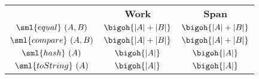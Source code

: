 \begin{costspec}[StringElt]
\label{cost:string}
\begin{tabular}{c|c|c}
& \textbf{Work} & \textbf{Span} \\
$\sml{equal}~(A,B)$ & $\bigoh{|A| + |B|}$ & $\bigoh {|A| + |B|}$ \\
$\sml{compare}~(A,B)$ & $\bigoh {|A| + |B|}$ & $\bigoh {|A| + |B|}$ \\
$\sml{hash}~(A)$ & $\bigoh {|A|}$ & $\bigoh {|A|}$ \\
$\sml{toString}~(A)$ & $\bigoh {|A|}$ & $\bigoh {|A|}$ \\
\end{tabular}
\end{costspec}
    